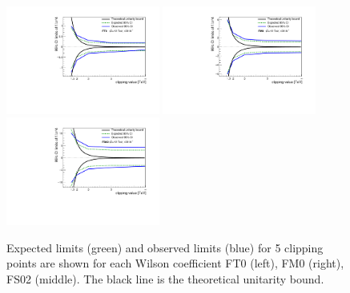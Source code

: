 \begin{figure}[ht]
    \centering
     \includegraphics[width=0.45\textwidth]{figures/aQGC/FT0limit.pdf}
    	\includegraphics[width=0.45\textwidth]{figures/aQGC/FM0limit.pdf}
    	\includegraphics[width=0.45\textwidth]{figures/aQGC/FS02limit.pdf} 
        \caption{Expected limits (green) and observed limits (blue) for 5 clipping points are shown for each Wilson coefficient FT0 (left), FM0 (right), FS02 (middle). The black line is the theoretical unitarity bound.}
        \label{fig:aQGClimits}
\end{figure}

